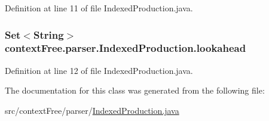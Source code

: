 Definition at line 11 of file Indexed\-Production.\-java.

\hypertarget{classcontext_free_1_1parser_1_1_indexed_production_a58e8935cd1c81a767b47b4d31c87b35c}{
\subsubsection[{lookahead}]{\setlength{\rightskip}{0pt plus 5cm}Set$<$String$>$ {\bf context\-Free.\-parser.\-Indexed\-Production.\-lookahead}}}\label{classcontext_free_1_1parser_1_1_indexed_production_a58e8935cd1c81a767b47b4d31c87b35c}


Definition at line 12 of file Indexed\-Production.\-java.



The documentation for this class was generated from the following file\-:\begin{DoxyCompactItemize}
\item 
src/context\-Free/parser/\hyperlink{_indexed_production_8java}{Indexed\-Production.\-java}\end{DoxyCompactItemize}
